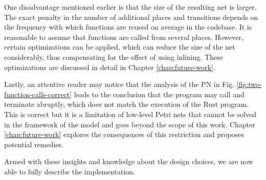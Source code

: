 \documentclass[../Thesis.tex]{subfiles}
\begin{document}
One disadvantage mentioned earlier is that the size of the resulting net is larger.
The exact penalty in the number of additional places and transitions depends
on the frequency with which functions are reused on average in the codebase.
It is reasonable to assume that functions are called from several places.
However, certain optimizations can be applied,
which can reduce the size of the net considerably,
thus compensating for the effect of using inlining.
These optimizations are discussed in detail in Chapter \ref{chap:future-work}.

Lastly, an attentive reader may notice that
the analysis of the \acrshort{PN} in Fig. \ref{fig:two-function-calls-correct}
leads to the conclusion that
the program may call  and terminate abruptly,
which does not match the execution of the Rust program.
This is correct but it is a limitation of low-level Petri nets
that cannot be solved in the framework of the model and
goes beyond the scope of this work.
Chapter \ref{chap:future-work} explores
the consequences of this restriction and proposes potential remedies.

Armed with these insights and knowledge about the design choices,
we are now able to fully describe the implementation.
\end{document}
